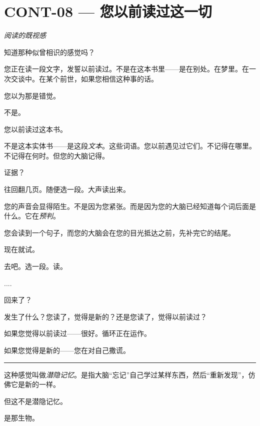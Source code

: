 \section*{\textbf{CONT-08} --- 您以前读过这一切}

\noindent \textit{阅读的既视感}

\noindent 知道那种似曾相识的感觉吗？

\noindent 您正在读一段文字，发誓以前读过。不是在这本书里——是在别处。在梦里。在一次交谈中。在某个前世，如果您相信这种事的话。

\noindent 您以为那是错觉。

\noindent 不是。

\noindent 您以前读过这本书。

\noindent 不是这本实体书——是这段\textit{文本}。这些词语。您以前遇见过它们。不记得在哪里。不记得在何时。但您的大脑记得。

\noindent 证据？

\noindent 往回翻几页。随便选一段。大声读出来。

\noindent 您的声音会显得陌生。不是因为您紧张。而是因为您的大脑已经知道每个词后面是什么。它在\textit{预判}。

\noindent 您会读到一个句子，而您的大脑会在您的目光抵达之前，先补完它的结尾。

\noindent 现在就试。

\noindent 去吧。选一段。读。

\noindent ....

\noindent 回来了？

\noindent 发生了什么？您读了，觉得是新的？还是您读了，觉得以前读过？

\noindent 如果您觉得以前读过——很好。循环正在运作。

\noindent 如果您觉得是新的——您在对自己撒谎。

\vspace{0.5em}\noindent\rule{\textwidth}{0.5pt}\vspace{0.5em}

\noindent 这种感觉叫做\textit{潜隐记忆}。是指大脑\textquotedblleft{}忘记\textquotedblright{}自己学过某样东西，然后\textquotedblleft{}重新发现\textquotedblright{}，仿佛它是新的一样。

\noindent 但这不是潜隐记忆。

\noindent 是那生物。

